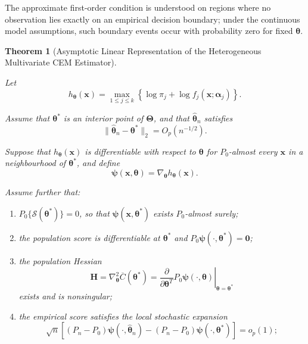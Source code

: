 \documentclass[pdflatex,sn-mathphys-ay]{sn-jnl}%
\let\oldtheta\theta
\renewcommand{\theta}{\boldsymbol{\oldtheta}}
\let\oldalpha\alpha
\renewcommand{\alpha}{\boldsymbol{\oldalpha}}
\theoremstyle{thmstyleone}%
\newtheorem{theorem}{Theorem}%
\theoremstyle{thmstyletwo}%
\theoremstyle{thmstylethree}%
\begin{document}
The approximate first-order condition is understood on regions where no observation lies exactly on an empirical decision boundary; under the continuous model assumptions, such boundary events occur with probability zero for fixed $\boldsymbol{\theta}$.

\begin{theorem}[Asymptotic Linear Representation of the Heterogeneous Multivariate CEM Estimator]
\label{thm:linear_representation}

Let
\[
    h_{\boldsymbol{\theta}}(\mathbf{x})
    =
    \max_{1\leq j\leq k}
    \left\{
        \log \pi_j
        +
        \log f_j(\mathbf{x};\boldsymbol{\alpha}_j)
    \right\}.
\]

Assume that $\boldsymbol{\theta}^*$ is an interior point of $\boldsymbol{\Theta}$, and that $\widehat{\boldsymbol{\theta}}_n$ satisfies
\[
    \|
        \widehat{\boldsymbol{\theta}}_n
        -
        \boldsymbol{\theta}^*
    \|_2
    =
    O_p(n^{-1/2}).
\]

Suppose that $ h_{\boldsymbol{\theta}}(\mathbf{x})$ is differentiable with respect to $ \boldsymbol{\theta}$
for $ P_0$-almost every $  \mathbf{x}$ in a neighbourhood of $ \boldsymbol{\theta}^*$,
and define
\[
    \boldsymbol{\psi}(\mathbf{x},\boldsymbol{\theta})
    =
    \nabla_{\boldsymbol{\theta}}
    h_{\boldsymbol{\theta}}(\mathbf{x}).
\]

Assume further that:

\begin{enumerate}

\item$ P_0
    \{
        \mathcal{S}(\boldsymbol{\theta}^*)
    \}
    =
    0$, so that $ \boldsymbol{\psi}(\mathbf{x},\boldsymbol{\theta}^*)$ exists $ P_0$-almost surely;

\item
the population score is differentiable at $\boldsymbol{\theta}^*$ and $ P_0
    \boldsymbol{\psi}
    (\cdot,\boldsymbol{\theta}^*)
    =
    \mathbf{0}$;


\item
the population Hessian
\[
    \mathbf{H}
    =
    \nabla_{\boldsymbol{\theta}}^2
    \overline{C}(\boldsymbol{\theta}^*)
    =
    \left.
    \frac{
        \partial
    }{
        \partial
        \boldsymbol{\theta}^T
    }
    P_0
    \boldsymbol{\psi}
    (\cdot,\boldsymbol{\theta})
    \right|_{
        \boldsymbol{\theta}
        =
        \boldsymbol{\theta}^*
    }
\]
exists and is nonsingular;

\item
the empirical score satisfies the local stochastic expansion
\[
    \sqrt{n}
    \left[
        (P_n-P_0)
        \boldsymbol{\psi}
        (\cdot,\widehat{\boldsymbol{\theta}}_n)
        -
        (P_n-P_0)
        \boldsymbol{\psi}
        (\cdot,\boldsymbol{\theta}^*)
    \right]
    =
    o_p(1);
\]


\end{enumerate}
\end{theorem}
\end{document}
